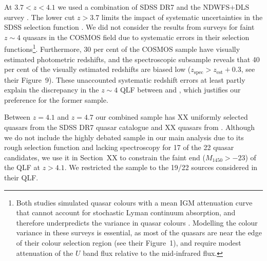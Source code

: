 \documentclass[a4paper,fleqn,usenatbib]{mnras}
\begin{document}
At $3.7<z<4.1$ we used a combination of SDSS DR7 \citep[XX uniformly
  selected quasars from][]{2010AJ....139.2360S} and the NDWFS$+$DLS
survey \citep{2010ApJ...710.1498G,2011ApJ...728L..26G}. The lower cut
$z>3.7$ limits the impact of systematic uncertainties in the
\citet{2006AJ....131.2766R} SDSS selection function
\citep{2009ApJ...705L.113P, 2011ApJ...728...23W}. We did not consider
the results from surveys for faint $z\sim 4$ quasars in the COSMOS
field \citep{2011ApJ...728L..25I, 2012ApJ...755..169M} due to
systematic errors in their selection functions\footnote{Both studies
  simulated quasar colours with a mean IGM attenuation curve
  \citep{1995ApJ...441...18M} that cannot account for stochastic Lyman
  continuum absorption, and therefore underpredicts the variance in
  quasar colours \citep{1999ApJ...518..103B, 2008MNRAS.387.1681I,
    2011ApJ...728...23W}. Modelling the colour variance in these
  surveys is essential, as most of the \citet{2011ApJ...728L..25I}
  quasars are near the edge of their colour selection region (see
  their Figure~1), and \citet{2012ApJ...755..169M} require modest
  attenuation of the $U$ band flux relative to the mid-infrared
  flux.}. Furthermore, 30 per cent of the \citet{2012ApJ...755..169M}
COSMOS sample have visually estimated photometric redshifts, and the
spectroscopic subsample reveals that 40 per cent of the visually
estimated redshifts are biased low
($z_\mathrm{spec}>z_\mathrm{est}+0.3$, see their Figure~9). These
unaccounted systematic redshift errors at least partly explain the
discrepancy in the $z\sim 4$ QLF between \citet{2011ApJ...728L..26G}
and \citet{2012ApJ...755..169M}, which justifies our preference for
the former sample.

Between $z=4.1$ and $z=4.7$ our combined sample has XX uniformly
selected quasars from the SDSS DR7 quasar catalogue
\citep{2010AJ....139.2360S} and XX quasars from
\citet{2011ApJ...728L..26G}. Although we do not include the highly
debated \citet{2015AA...578A..83G} sample in our main analysis due to
its rough selection function and lacking spectroscopy for 17 of the 22
quasar candidates, we use it in Section~XX to constrain the faint end
($M_{1450}>-23$) of the QLF at $z>4.1$. We restricted the
\citet{2015AA...578A..83G} sample to the 19/22 sources considered in
their QLF.
\end{document}
